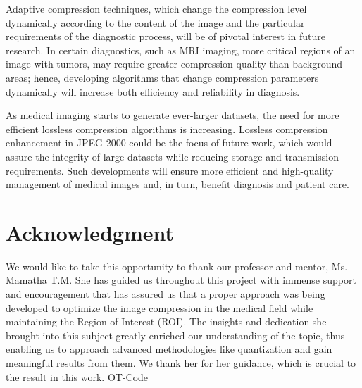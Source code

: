 \documentclass[conference,letterpaper]{IEEEtran}
\begin{document}
Adaptive compression techniques, which change the compression level dynamically according to the content of the image and the particular requirements of the diagnostic process, will be of pivotal interest in future research. In certain diagnostics, such as MRI imaging, more critical regions of an image with tumors, may require greater compression quality than background areas; hence, developing algorithms that change compression parameters dynamically will increase both efficiency and reliability in diagnosis.

As medical imaging starts to generate ever-larger datasets, the need for more efficient lossless compression algorithms is increasing. Lossless compression enhancement in JPEG 2000 could be the focus of future work, which would assure the integrity of large datasets while reducing storage and transmission requirements.
Such developments will ensure more efficient and high-quality management of medical images and, in turn, benefit diagnosis and patient care.

\section{Acknowledgment}
We would like to take this opportunity to thank our professor and mentor, Ms. Mamatha T.M. She has guided us throughout this project with immense support and encouragement that has assured us that a proper approach was being developed to optimize the image compression in the medical field while maintaining the Region of Interest (ROI). The insights and dedication she brought into this subject greatly enriched our understanding of the topic, thus enabling us to approach advanced methodologies like quantization and gain meaningful results from them. We thank her for her guidance, which is crucial to the result in this work.\href{https://aseblr-my.sharepoint.com/:f:/g/personal/bl_en_u4cse23053_bl_students_amrita_edu/EoBQkj1sX41OnATeKMNuWaoBVwaYSTVmQtu9JLaZzlB1cA?e=U23Ujh}{ OT-Code} \\
\end{document}
